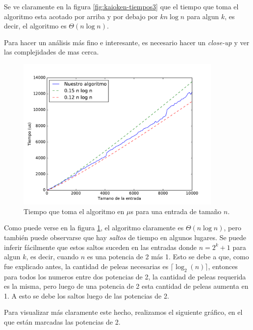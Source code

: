 Se ve claramente en la figura \ref{fig:kaioken-tiempos3} que el tiempo que toma el algoritmo esta acotado por arriba y por debajo por $k n \log n$ para algun $k$, es decir, el algoritmo es $\Theta(n \log n)$.

Para hacer un análisis más fino e interesante, es necesario hacer un \emph{close-up} y ver las complejidades de mas cerca.

\begin{figure}[H]
 \centering
	\includegraphics[width=0.9\textwidth]{img/tiempos/kaioken1.pdf}
	\caption{\footnotesize Tiempo que toma el algoritmo en $\mu$s para una entrada de tamaño $n$.}
	\label{fig:kaioken-tiempos1}
\end{figure}

Como puede verse en la figura \ref{fig:kaioken-tiempos1}, el algoritmo claramente es $\Theta(n \log n)$, pero también puede observarse que hay \emph{saltos} de tiempo en algunos lugares. Se puede inferir fácilmente que estos saltos suceden en las entradas donde $n = 2^k + 1$ para algun $k$, es decir, cuando $n$ es una potencia de 2 más 1. Esto se debe a que, como fue explicado antes, la cantidad de peleas necesarias es $\lceil \log_2(n) \rceil$, entonces para todos los numeros entre dos potencias de 2, la cantidad de peleas requerida es la misma, pero luego de una potencia de 2 esta cantidad de peleas aumenta en 1. A esto se debe los saltos luego de las potencias de 2.

Para visualizar más claramente este hecho, realizamos el siguiente gráfico, en el que están marcadas las potencias de 2.

